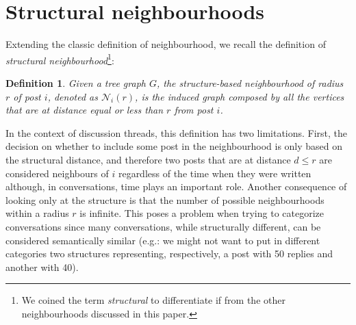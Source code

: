 \documentclass[conference]{IEEEtran}
\newtheorem{definition}{Definition}
\begin{document}




\section{Structural neighbourhoods}\label{sec:structural}
Extending the classic definition of neighbourhood, we recall the definition of \textit{structural neighbourhood}\footnote{We coined the term \textit{structural} to differentiate if from the other neighbourhoods discussed in this paper.}:

\begin{definition}
Given a tree graph $G$, the \textit{structure-based neighbourhood} of radius $r$ of post $i$, denoted as $\mathcal{N}_i(r)$, is the induced graph composed by all the vertices that are at distance equal or less than $r$ from post $i$.
\end{definition}
In the context of discussion threads, this definition has two limitations. First, the decision on whether to include some post in the neighbourhood is only based on the structural distance, and therefore two posts that are at distance $d\leq r$ are considered neighbours of $i$ regardless of the time when they were written although, in conversations, time plays an important role. Another consequence of looking only at the structure is that the number of possible neighbourhoods within a radius $r$ is infinite. This poses a problem when trying to categorize conversations since many conversations, while structurally different, can be considered semantically similar (e.g.: we might not want to put in different categories two structures representing, respectively, a post with 50 replies and another with 40).
\end{document}
